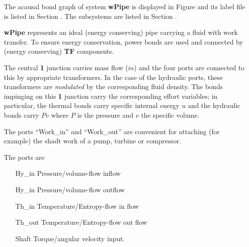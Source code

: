 

   The acausal bond graph of system \textbf{wPipe} is
   displayed in Figure  and its label
   file is listed in Section .
   The subsystems are listed in Section .

\textbf{wPipe} represents an ideal (energy conserving) pipe carrying a
fluid with work transfer. To ensure energy conservation, power bonds are used and
connected by (energy conserving) \textbf{TF} components.

The central \textbf{1} junction carries mass flow ($\dot m$) and the
four ports are connected to this by appropriate transformers. In the
case of the hydraulic ports, these transformers are \emph{modulated}
by the corresponding fluid density.
The bonds impinging on this  \textbf{1} junction carry the
corresponding effort variables; in particular, the thermal bonds carry
specific internal energy $u$ and the hydraulic bonds carry $Pv$ where
$P$ is the pressure and $v$ the specific volume.

The ports ``Work\_in'' and ``Work\_out'' are convenient for attaching
(for example) the shadt work of a pump, turbine or compressor.

The ports are 
\begin{itemize}
\item [Hy\_in] Pressure/volume-flow inflow
\item [Hy\_in] Pressure/volume-flow outflow
\item [Th\_in] Temperature/Entropy-flow in flow
\item [Th\_out] Temperature/Entropy-flow out flow
\item [Shaft] Torque/angular velocity input.
\end{itemize}

